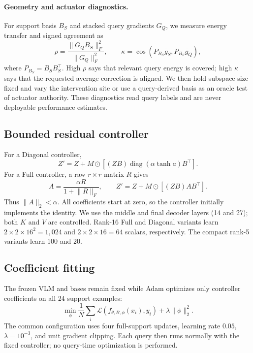 \documentclass[conference]{IEEEtran}
\begin{document}
\paragraph{Geometry and actuator diagnostics.}
For support basis $B_S$ and stacked query gradients $G_Q$, we measure energy
transfer and signed agreement as
\begin{equation}
\rho=\frac{\lVert G_QB_S\rVert_F^2}{\lVert G_Q\rVert_F^2},\qquad
\kappa=\cos(P_{B_S}\bar g_S,P_{B_S}\bar g_Q),
\end{equation}
where $P_{B_S}=B_SB_S^\top$.  High $\rho$ says that relevant query energy is
covered; high $\kappa$ says that the requested average correction is aligned.
We then hold subspace size fixed and vary the intervention site or use a
query-derived basis as an oracle test of actuator authority.  These diagnostics
read query labels and are never deployable performance estimates.

\subsection{Bounded residual controller}
For a Diagonal controller,
\begin{equation}
Z'=Z+M\odot\left[(ZB)\operatorname{diag}(\alpha\tanh a)B^\top\right].
\end{equation}
For a Full controller, a raw $r\times r$ matrix $R$ gives
\begin{equation}
A=\frac{\alpha R}{1+\lVert R\rVert_F},\qquad
Z'=Z+M\odot\left[(ZB)AB^\top\right].
\end{equation}
Thus $\lVert A\rVert_2<\alpha$. All coefficients start at zero, so the
controller initially implements the identity. We use the middle and final
decoder layers (14 and 27); both $K$ and $V$ are controlled. Rank-16 Full and
Diagonal variants learn $2\times2\times16^2=1{,}024$ and
$2\times2\times16=64$ scalars, respectively. The compact rank-5 variants learn
100 and 20.

\subsection{Coefficient fitting}
The frozen VLM and bases remain fixed while Adam optimizes only controller
coefficients on all 24 support examples:
\begin{equation}
\min_\phi\frac{1}{N}\sum_i\mathcal{L}(f_{\theta,B,\phi}(x_i),y_i)
+\lambda\lVert\phi\rVert_2^2.
\end{equation}
The common configuration uses four full-support updates, learning rate $0.05$,
$\lambda=10^{-3}$, and unit gradient clipping. Each query then runs normally
with the fixed controller; no query-time optimization is performed.
\end{document}
